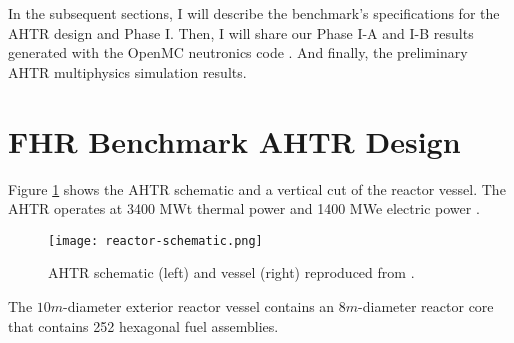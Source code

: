 In the subsequent sections, I will describe the benchmark's specifications for 
the \gls{AHTR} design and Phase I. Then, I will share our Phase I-A and I-B 
results generated with the OpenMC neutronics code \cite{romano_openmc_2013}. 
And finally, the preliminary \gls{AHTR} multiphysics simulation results.  

\section{FHR Benchmark \acrlong{AHTR} Design}
Figure \ref{fig:reactor-schematic} shows the \acrfull{AHTR} schematic and a vertical 
cut of the reactor vessel. 
The \gls{AHTR} operates at 3400 MWt thermal power and 1400 MWe 
electric power \cite{varma_ahtr_2012}. 
\begin{figure}[htbp]
    \centering
    \texttt{[image: reactor-schematic.png]} 
    \caption{\acrfull{AHTR} schematic (left) and vessel (right) reproduced from
    \cite{petrovic_benchmark_2021}.}
    \label{fig:reactor-schematic}
\end{figure}
The $10m$-diameter exterior reactor vessel contains an $8m$-diameter 
reactor core that contains 252 hexagonal fuel assemblies.

